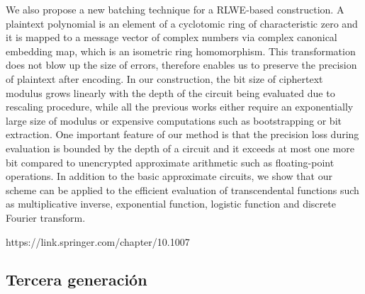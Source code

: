 \begin{itemize}
    We also propose a new batching technique for a RLWE-based construction. A plaintext polynomial is an element of a cyclotomic ring of characteristic zero and it is mapped to a message vector of complex numbers via complex canonical embedding map, which is an isometric ring homomorphism. This transformation does not blow up the size of errors, therefore enables us to preserve the precision of plaintext after encoding. In our construction, the bit size of ciphertext modulus grows linearly with the depth of the circuit being evaluated due to rescaling procedure, while all the previous works either require an exponentially large size of modulus or expensive computations such as bootstrapping or bit extraction. One important feature of our method is that the precision loss during evaluation is bounded by the depth of a circuit and it exceeds at most one more bit compared to unencrypted approximate arithmetic such as floating-point operations. In addition to the basic approximate circuits, we show that our scheme can be applied to the efficient evaluation of transcendental functions such as multiplicative inverse, exponential function, logistic function and discrete Fourier transform.

    https://link.springer.com/chapter/10.1007%

\end{itemize}

\subsection{Tercera generación}

